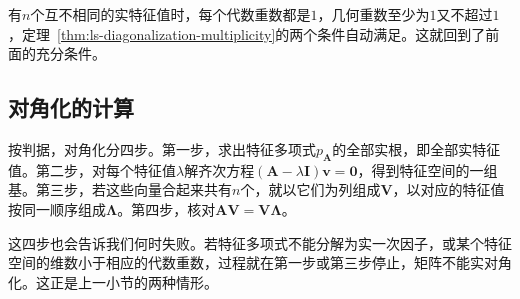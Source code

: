 有$n$个互不相同的实特征值时，每个代数重数都是$1$，几何重数至少为$1$又不超过$1$，定理~\ref{thm:ls-diagonalization-multiplicity}的两个条件自动满足。这就回到了前面的充分条件。

\subsection{对角化的计算}

按判据，对角化分四步。第一步，求出特征多项式$p_{\bm A}$的全部实根，即全部实特征值。第二步，对每个特征值$\lambda$解齐次方程$(\bm A-\lambda\bm I)\bm v=\bm0$，得到特征空间的一组基。第三步，若这些向量合起来共有$n$个，就以它们为列组成$\bm V$，以对应的特征值按同一顺序组成$\bm\Lambda$。第四步，核对$\bm A\bm V=\bm V\bm\Lambda$。

这四步也会告诉我们何时失败。若特征多项式不能分解为实一次因子，或某个特征空间的维数小于相应的代数重数，过程就在第一步或第三步停止，矩阵不能实对角化。这正是上一小节的两种情形。

